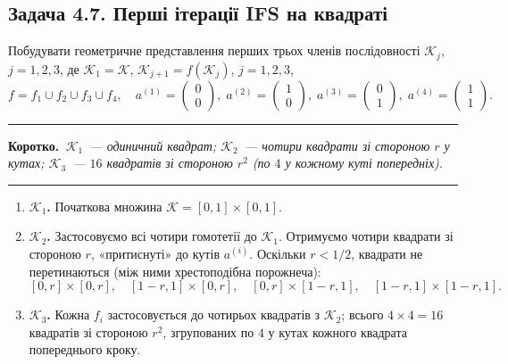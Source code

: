 \documentclass[12pt,a4paper]{article}
\newenvironment{korotko}
  {\par\medskip\noindent\begingroup\color{accent!75!black}\rule{\linewidth}{0.4pt}\par
   \noindent\textbf{Коротко.}\itshape\,}
  {\par\noindent\rule{\linewidth}{0.4pt}\endgroup\medskip}
\begin{document}
\subsection{Задача 4.7. Перші ітерації IFS на квадраті}
Побудувати геометричне представлення перших трьох членів послідовності
$\mathcal{K}_j$, $j=1,2,3$, де $\mathcal{K}_1=\mathcal{K}$,
$\mathcal{K}_{j+1}=f(\mathcal{K}_j)$, $j=1,2,3$,
\begin{equation*}
  f=f_1\cup f_2\cup f_3\cup f_4,\quad
  a^{(1)}=\begin{pmatrix}0\\0\end{pmatrix},\;
  a^{(2)}=\begin{pmatrix}1\\0\end{pmatrix},\;
  a^{(3)}=\begin{pmatrix}0\\1\end{pmatrix},\;
  a^{(4)}=\begin{pmatrix}1\\1\end{pmatrix}.
\end{equation*}

\begin{korotko}
$\mathcal{K}_1$~--- одиничний квадрат; $\mathcal{K}_2$~--- чотири квадрати зі
стороною $r$ у кутах; $\mathcal{K}_3$~--- $16$ квадратів зі стороною $r^2$
(по $4$ у кожному куті попередніх).
\end{korotko}

\begin{enumerate}[leftmargin=1.6em,itemsep=0.35em]
  \item \textbf{$\mathcal{K}_1$.} Початкова множина $\mathcal{K}=[0,1]\times[0,1]$.
  \item \textbf{$\mathcal{K}_2$.} Застосовуємо всі чотири гомотетії до $\mathcal{K}_1$.
        Отримуємо чотири квадрати зі стороною $r$, «притиснуті» до кутів $a^{(i)}$.
        Оскільки $r<1/2$, квадрати не перетинаються (між ними хрестоподібна порожнеча):
        \[
          [0,r]\times[0,r],\quad [1-r,1]\times[0,r],\quad
          [0,r]\times[1-r,1],\quad [1-r,1]\times[1-r,1].
        \]
  \item \textbf{$\mathcal{K}_3$.} Кожна $f_i$ застосовується до чотирьох квадратів з
        $\mathcal{K}_2$; всього $4\times4=16$ квадратів зі стороною $r^2$, згрупованих
        по $4$ у кутах кожного квадрата попереднього кроку.
\end{enumerate}
\end{document}
